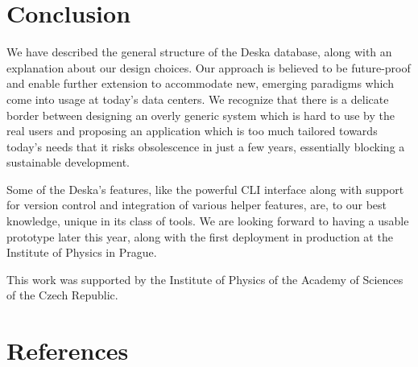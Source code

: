 \documentclass[a4paper]{jpconf}
\begin{document}
\section{Conclusion}

We have described the general structure of the Deska database, along with an explanation about our design choices.  Our approach is
believed to be future-proof and enable further extension to accommodate new, emerging paradigms which come into usage at today's data
centers.  We recognize that there is a delicate border between designing an overly generic system which is hard to use by the real
users and proposing an application which is too much tailored towards today's needs that it risks obsolescence in just a few years,
essentially blocking a sustainable development.

Some of the Deska's features, like the powerful CLI interface along with support for version control and integration of various helper
features, are, to our best knowledge, unique in its class of tools.  We are looking forward to having a usable prototype later this
year, along with the first deployment in production at the Institute of Physics in Prague.

\ack
This work was supported by the Institute of Physics of the Academy of Sciences of the Czech Republic.

\section*{References}


\end{document}
